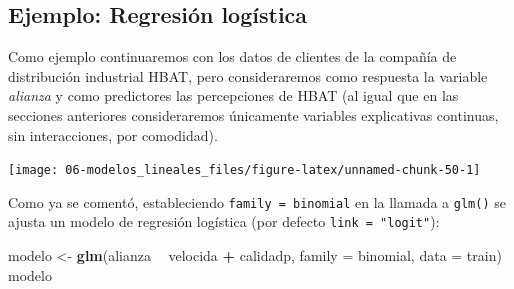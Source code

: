 \documentclass[
  spanish,
]{book}
\newenvironment{Shaded}{\begin{snugshade}}{\end{snugshade}}
\newcommand{\CommentTok}[1]{\textcolor[rgb]{0.56,0.35,0.01}{\textit{#1}}}
\newcommand{\DataTypeTok}[1]{\textcolor[rgb]{0.13,0.29,0.53}{#1}}
\newcommand{\DecValTok}[1]{\textcolor[rgb]{0.00,0.00,0.81}{#1}}
\newcommand{\FloatTok}[1]{\textcolor[rgb]{0.00,0.00,0.81}{#1}}
\newcommand{\KeywordTok}[1]{\textcolor[rgb]{0.13,0.29,0.53}{\textbf{#1}}}
\newcommand{\NormalTok}[1]{#1}
\newcommand{\OperatorTok}[1]{\textcolor[rgb]{0.81,0.36,0.00}{\textbf{#1}}}
\newcommand{\StringTok}[1]{\textcolor[rgb]{0.31,0.60,0.02}{#1}}
\theoremstyle{break}
\theoremstyle{definition}
\theoremstyle{definition}
\theoremstyle{definition}
\theoremstyle{remark}
\begin{document}
\hypertarget{ejemplo-regresiuxf3n-loguxedstica}{%
\subsection{Ejemplo: Regresión logística}\label{ejemplo-regresiuxf3n-loguxedstica}}

Como ejemplo continuaremos con los datos de clientes de la compañía de distribución industrial HBAT, pero consideraremos como respuesta la variable \emph{alianza} y como predictores las percepciones de HBAT (al igual que en las secciones anteriores consideraremos únicamente variables explicativas continuas, sin interacciones, por comodidad).

\begin{Shaded}
\end{Shaded}

\begin{center}\texttt{[image: 06-modelos\_lineales\_files/figure-latex/unnamed-chunk-50-1]} \end{center}

Como ya se comentó, estableciendo \texttt{family\ =\ binomial} en la llamada a \texttt{glm()} se ajusta un modelo de regresión logística (por defecto \texttt{link\ =\ "logit"}):

\begin{Shaded}
\begin{Highlighting}[]
\NormalTok{modelo <-}\StringTok{ }\KeywordTok{glm}\NormalTok{(alianza }\OperatorTok{~}\StringTok{ }\NormalTok{velocida }\OperatorTok{+}\StringTok{ }\NormalTok{calidadp, }\DataTypeTok{family =}\NormalTok{ binomial, }\DataTypeTok{data =}\NormalTok{ train)}
\NormalTok{modelo}
\end{Highlighting}
\end{Shaded}
\end{document}
